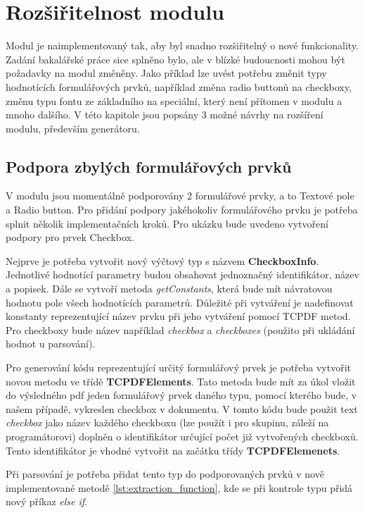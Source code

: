 \chapter{Rozšiřitelnost modulu}
Modul je naimplementovaný tak, aby byl snadno rozšiřitelný o nové funkcionality. Zadání bakalářské práce sice splněno bylo, ale v blízké budoucnosti mohou být požadavky na modul změněny. Jako příklad lze uvést potřebu změnit typy hodnotících formulářových prvků, například změna radio buttonů na checkboxy, změnu typu fontu ze základního na speciální, který není přítomen v modulu a mnoho dalšího. V této kapitole jsou popsány 3 možné návrhy na rozšíření modulu, především generátoru.

\section{Podpora zbylých formulářových prvků}
V modulu jsou momentálně podporovány 2 formulářové prvky, a to Textové pole a Radio button. Pro přidání podpory jakéhokoliv formulářového prvku je potřeba splnit několik implementačních kroků. Pro ukázku bude uvedeno vytvoření podpory pro prvek Checkbox.
\par
Nejprve je potřeba vytvořit nový výčtový typ s názvem \textbf{CheckboxInfo}. Jednotlivé hodnotící parametry budou obsahovat jednoznačný identifikátor, název a popisek. Dále se vytvoří metoda \textit{getConstants}, která bude mít návratovou hodnotu pole všech hodnotících parametrů. Důležité při vytváření je nadefinovat konstanty reprezentující název prvku při jeho vytváření pomocí TCPDF metod. Pro checkboxy bude název například \textit{checkbox} a \textit{checkboxes} (použito při ukládání hodnot u parsování).
\par
Pro generování kódu reprezentující určitý formulářový prvek je potřeba vytvořit novou metodu ve třídě \textbf{TCPDFElements}. Tato metoda bude mít za úkol vložit do výsledného pdf jeden formulářový prvek daného typu, pomocí kterého bude, v našem případě, vykreslen checkbox v dokumentu. V tomto kódu bude použit text \textit{checkbox} jako název každého checkboxu (lze použít i pro skupinu, záleží na programátorovi) doplněn o identifikátor určující počet již vytvořených checkboxů. Tento identifikátor je vhodné vytvořit na začátku třídy \textbf{TCPDFElemenets}.
\par
Při parsování je potřeba přidat tento typ do podporovaných prvků v nově implementované metodě \ref{lst:extraction_function}, kde se při kontrole typu přidá nový příkaz \textit{else if}.
\par
